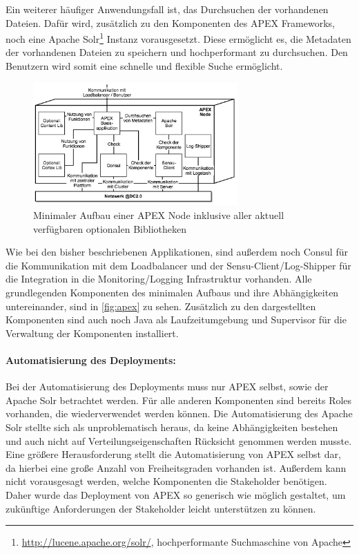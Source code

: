 Ein weiterer häufiger Anwendungsfall ist, das Durchsuchen der vorhandenen Dateien. Dafür wird, zusätzlich zu den Komponenten des APEX Frameworks, noch eine Apache Solr\footnote{\url{http://lucene.apache.org/solr/}, hochperformante Suchmaschine von Apache} Instanz vorausgesetzt. Diese ermöglicht es, die Metadaten der vorhandenen Dateien zu speichern und hochperformant zu durchsuchen. Den Benutzern wird somit eine schnelle und flexible Suche ermöglicht. 
\begin{figure}[ht]
	\centering
	\includegraphics[width=0.7\textwidth]{img/apex.png}
	\caption[Minimaler Aufbau einer APEX Node]{Minimaler Aufbau einer APEX Node inklusive aller aktuell verfügbaren optionalen Bibliotheken}
	\label{fig:apex}
\end{figure} 
Wie bei den bisher beschriebenen Applikationen, sind außerdem noch Consul für die Kommunikation mit dem Loadbalancer und der Sensu-Client/Log-Shipper für die Integration in die Monitoring/Logging Infrastruktur vorhanden. Alle grundlegenden Komponenten des minimalen Aufbaus und ihre Abhängigkeiten untereinander, sind in \autoref{fig:apex} zu sehen. Zusätzlich zu den dargestellten Komponenten sind auch noch Java als Laufzeitumgebung und Supervisor für die Verwaltung der Komponenten installiert.

\paragraph{Automatisierung des Deployments:}
Bei der Automatisierung des Deployments muss nur APEX selbst, sowie der Apache Solr betrachtet werden. Für alle anderen Komponenten sind bereits Roles vorhanden, die wiederverwendet werden können. Die Automatisierung des Apache Solr stellte sich als unproblematisch heraus, da keine Abhängigkeiten bestehen und auch nicht auf Verteilungseigenschaften Rücksicht genommen werden musste. Eine größere Herausforderung stellt die Automatisierung von APEX selbst dar, da hierbei eine große Anzahl von Freiheitsgraden vorhanden ist. Außerdem kann nicht vorausgesagt werden, welche Komponenten die Stakeholder benötigen. Daher wurde das Deployment von APEX so generisch wie möglich gestaltet, um zukünftige Anforderungen der Stakeholder leicht unterstützen zu können.

